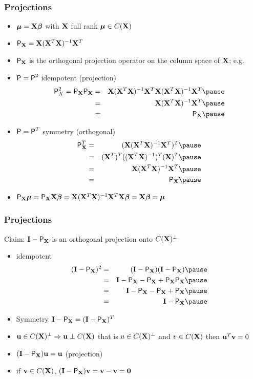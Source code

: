 \documentclass{beamer}
\begin{document}
\begin{frame} \frametitle{Projections}
  \begin{itemize}
\item $\mub = \X \b$ with $\X$ full rank $\mub \in C(\X)$
\item $\P_\X = \X (\X^T\X)^{-1} \X^T$
\item $\P_\X$ is the orthogonal projection operator on the column
  space of $\X$; e.g. 
\item $\P = \P^2$  idempotent (projection)  \pause
  \begin{eqnarray*}
 \P_X^2 = \P_\X \P_\X & = &\X(\X^T\X)^{-1} \X^T\X(\X^T\X)^{-1} \X^T   \pause \\
             & = & \X(\X^T\X)^{-1}\X^T \pause\\
 & = & \P_{\X} \pause
  \end{eqnarray*}
\item $\P = \P^T$ symmetry (orthogonal) \pause
 \begin{eqnarray*}
 \P_\X^T  & = & (\X(\X^T\X)^{-1}\X^T)^T \pause \\
             & = & (\X^T)^T((\X^T\X)^{-1})^T(\X)^T \pause \\
 & = &  \X(\X^T\X)^{-1}\X^T \pause \\
 & = & \P_{\X} \pause
  \end{eqnarray*}
\item $\P_{\X} \mub = \P_{\X} \X \b = \X(\X^T\X)^{-1}\X^T
  \X \b = \X\b = \mub$
\end{itemize}
\end{frame}

\begin{frame} \frametitle{Projections}
  Claim: $\I - \P_\X$ is an orthogonal projection onto $C(\X)^{\perp}$ \pause
  \begin{itemize}
  \item idempotent  \pause
    \begin{eqnarray*}
(\I - \P_{\X})^2 &= & (\I - \P_\X)(\I - \P_\X)  \pause \\
& = & \I - \P_\X - \P_\X + \P_\X \P_\X       \pause \\
& = & \I - \P_\X -\P_\X + \P_\X  \pause\\
& = & \I - \P_\X  \pause
    \end{eqnarray*}
\item Symmetry $\I - \P_\X = (\I - \P_\X)^T$  \pause
\item $\u \in C(\X)^{\perp} \Rightarrow \u \perp C(\X)$ that is $u \in
  C(\X)^{\perp}$ and $v \in C(\X)$ then $\u^T\v = 0$

\item $(\I -\P_\X) \u  = \u$  (projection)  \pause
\item if $\v \in C(\X)$, $(\I - \P_\X ) \v = \v - \v = \zero$ 
  \end{itemize}
\end{frame}
\end{document}
